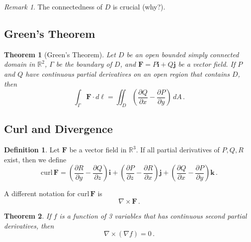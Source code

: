 \documentclass[
]{article}
\newtheorem{theorem}{Theorem}[section]
\theoremstyle{definition}
\newtheorem{definition}{Definition}[section]
\theoremstyle{definition}
\theoremstyle{definition}
\theoremstyle{definition}
\theoremstyle{remark}
\newtheorem*{remark}{Remark}
\begin{document}
\begin{remark}
The connectedness of \(D\) is crucial (why?).
\end{remark}

\hypertarget{greens-theorem}{%
\subsection{Green's Theorem}\label{greens-theorem}}

\begin{theorem}[Green's Theorem]
Let \(D\) be an open bounded simply connected domain in \(\mathbb{R}^2\),
\(\Gamma\) be the boundary of \(D\),
and \(\mathbf{F} = P\mathbf{i} + Q \mathbf{j}\) be a vector field.
If \(P\) and \(Q\) have continuous partial derivatives on an open region
that contains \(D\), then
\begin{equation*}
    \int_\Gamma \mathbf{F} \cdot d \ell  = \iint_D \left( \frac{\partial Q}{\partial x} - \frac{\partial P}{\partial y} \right) \, dA \,.
\end{equation*}
\end{theorem}

\hypertarget{curl-and-divergence}{%
\subsection{Curl and Divergence}\label{curl-and-divergence}}

\begin{definition}
Let \(\mathbf{F}\) be a vector field in \(\mathbb{R}^3\).
If all partial derivatives of \(P,Q,R\) exist, then we define
\begin{equation*}
    \mathrm{curl}\,\mathbf{F} =  \left( \frac{\partial R}{\partial y} - \frac{\partial Q}{\partial z} \right) \mathbf{i}
                       + \left( \frac{\partial P}{\partial z} - \frac{\partial R}{\partial x}  \right)  \mathbf{j}
                         + \left( \frac{\partial Q}{\partial x} - \frac{\partial P}{\partial y}  \right) \mathbf{k} \,.
\end{equation*}
\end{definition}

A different notation for \(\mathrm{curl} \, \mathbf{F}\) is
\begin{equation*}
    \nabla \times \mathbf{F} \,.
\end{equation*}

\begin{theorem}
If \(f\) is a function of 3 variables that has continuous second partial derivatives, then
\begin{equation*}
    \nabla \times ( \nabla f) = 0 \,.
\end{equation*}
\end{theorem}
\end{document}
